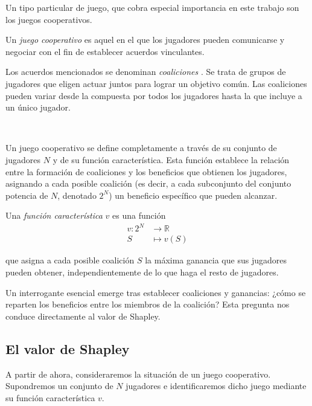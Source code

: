 Un tipo particular de juego, que cobra especial importancia
en este trabajo son los juegos cooperativos.

\begin{definition}
  Un \emph{juego cooperativo}  es aquel en
  el que los jugadores pueden comunicarse y negociar con el
  fin de establecer acuerdos vinculantes.
\end{definition}

Los acuerdos mencionados se denominan \emph{coaliciones} .
Se trata de grupos de jugadores que eligen actuar juntos para
lograr un objetivo común. Las coaliciones pueden
variar desde la compuesta por todos los jugadores hasta la que
incluye a un único jugador.

\

Un juego cooperativo se define completamente a través de su
conjunto de jugadores $N$  y de su función característica.
Esta función establece la relación entre la formación de
coaliciones y los beneficios que obtienen los jugadores,
asignando a cada posible coalición (es decir, a cada
subconjunto del conjunto potencia de $N$, denotado $2^N$) 
un beneficio específico que pueden alcanzar.

\begin{definition}
  Una \emph{función característica} $v$  es una función
  \begin{align*}
    v:2^N& \longrightarrow \mathbb{R}\\
    S&\longmapsto v(S)
  \end{align*}

  que asigna a cada posible coalición $S$  la máxima
  ganancia que sus jugadores pueden obtener,
  independientemente de lo que haga el resto de
  jugadores.
\end{definition}

Un interrogante esencial emerge tras establecer coaliciones
y ganancias: ¿cómo se reparten los beneficios entre los
miembros de la coalición? Esta pregunta nos
conduce directamente al valor de Shapley.

\subsection{El valor de Shapley}
\label{sec:valorShapley}

A partir de ahora, consideraremos la situación de un
juego cooperativo. Supondremos un conjunto de $N$ jugadores e
identificaremos dicho juego mediante su función
característica $v$.

